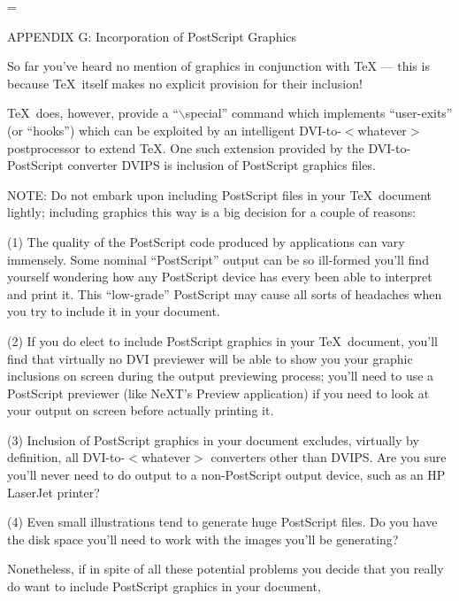 

\nopagenumbers
\headline={\hfill}
\twelvepoint
\centerline{\twlbf APPENDIX G: Incorporation of PostScript Graphics}
\bigskip\par\noindent
So far you've heard no mention of graphics in conjunction with \TeX{} --- 
this is because \TeX\ itself makes no explicit provision for their 
inclusion!
\bigskip\par\noindent
\TeX\ {\twlit does,} however, provide a ``{\twltt{}$\backslash$special}''
command which implements ``user-exits'' (or ``hooks'') which can be 
exploited by an intelligent DVI-to-$<$whatever$>$ postprocessor to extend
\TeX{}. One such extension provided by the DVI-to-PostScript converter
{\twltt DVIPS} is inclusion of PostScript graphics files.
\bigskip\par\noindent
NOTE: Do not embark upon including PostScript files in your \TeX\ document 
lightly; including graphics this way is a big decision for a 
couple of reasons:
\bigskip\par\noindent
(1) The quality of the PostScript code produced by applications can
vary immensely. Some nominal ``PostScript'' output can be so ill-formed 
you'll find yourself wondering how {\twlit any} PostScript device has 
every been able to interpret and print it. This ``low-grade'' PostScript
may cause all sorts of headaches when you try to include it in your
document.
\bigskip\par\noindent
(2) If you do elect to include PostScript graphics in your \TeX\ document,
you'll find that virtually no DVI previewer will be able to show you your 
graphic inclusions on screen during the output previewing process; you'll
need to use a PostScript previewer (like NeXT's Preview application) 
if you need to look at your output on screen before actually printing it.
\bigskip\par\noindent
(3) Inclusion of PostScript graphics in your document excludes, virtually
by definition, all DVI-to-$<$whatever$>$ converters other than DVIPS. Are
you {\twlit sure} you'll never need to do output to a non-PostScript output
device, such as an HP LaserJet printer?
\bigskip\par\noindent
(4) Even small illustrations tend to generate huge PostScript files.
Do you have the disk space you'll need to work with the images you'll be
generating?
\bigskip\par\noindent
Nonetheless, if in spite of all these potential problems you decide that 
you really {\twlit do} want to include PostScript graphics in your document, 
